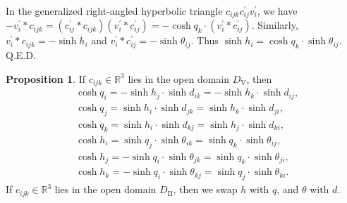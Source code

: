 \documentclass[12pt]{amsart}
\theoremstyle{definition}
\newtheorem{proposition}[theorem]{Proposition}
\def\qed{\hfill{Q.E.D.}\smallskip}
\begin{document}
In the generalized right-angled hyperbolic triangle $c_{ijk}c^\prime_{ij}v^\prime_i$,
we have $-v^\prime_i\ast c_{ijk}=(c^\prime_{ij}\ast c_{ijk})(v^\prime_i\ast c^\prime_{ij})=-\cosh q_k\cdot(v^\prime_i\ast c^\prime_{ij})$.
Similarly,
$v^\prime_i\ast c_{ijk}=-\sinh h_i$ and
$v^\prime_i\ast c^\prime_{ij}=-\sinh \theta_{ij}$.
Thus $\sinh h_i=\cosh q_k\cdot\sinh \theta_{ij}$.
\qed

\begin{proposition}
If $c_{ijk}\in \mathbb{R}^3$ lies in the open domain $D_\mathrm{V}$, then
\begin{equation*}
\begin{aligned}
&\cosh q_i=-\sinh h_j\cdot\sinh d_{ik}=-\sinh h_k\cdot\sinh d_{ij},\\
&\cosh q_j=\sinh h_i\cdot\sinh d_{jk}=\sinh h_k\cdot\sinh d_{ji},\\
&\cosh q_k=\sinh h_i\cdot\sinh d_{kj}=\sinh h_j\cdot\sinh d_{ki},\\
&\cosh h_i=\sinh q_j\cdot\sinh \theta_{ik}=\sinh q_k\cdot\sinh \theta_{ij},\\
&\cosh h_j=-\sinh q_i\cdot\sinh \theta_{jk}=\sinh q_k\cdot\sinh \theta_{ji},\\
&\cosh h_k=-\sinh q_i\cdot\sinh \theta_{kj}=\sinh q_j\cdot\sinh \theta_{ki}.
\end{aligned}
\end{equation*}
If $c_{ijk}\in \mathbb{R}^3$ lies in the open domain $D_\mathrm{II}$, then we swap $h$ with $q$, and $\theta$ with $d$.
\end{proposition}
\proof
\end{document}
